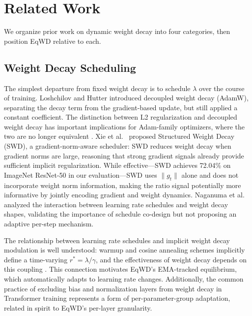 \documentclass{article}
\begin{document}
\section{Related Work}
\label{sec:related}

We organize prior work on dynamic weight decay into four categories,
then position EqWD relative to each.

\subsection{Weight Decay Scheduling}
\label{sec:related_scheduling}

The simplest departure from fixed weight decay is to schedule
$\lambda$ over the course of training. Loshchilov and Hutter
\citep{loshchilov2019adamw} introduced decoupled weight decay (AdamW),
separating the decay term from the gradient-based update, but still
applied a constant coefficient. The distinction between L2
regularization and decoupled weight decay has important implications for
Adam-family optimizers, where the two are no longer equivalent
\citep{loshchilov2019adamw}. Xie et al.~\citep{xie2023swd} proposed
Structured Weight Decay (SWD), a gradient-norm-aware scheduler: SWD
reduces weight decay when gradient norms are large, reasoning that
strong gradient signals already provide sufficient implicit
regularization. While effective---SWD achieves 72.04\% on ImageNet
ResNet-50 in our evaluation---SWD uses $\|g_t\|$ alone and does not
incorporate weight norm information, making the ratio signal potentially
more informative by jointly encoding gradient and weight dynamics.
Naganuma et al.~\citep{naganuma2026} analyzed the interaction between
learning rate schedules and weight decay shapes, validating the
importance of schedule co-design but not proposing an adaptive per-step
mechanism.

The relationship between learning rate schedules and implicit weight
decay modulation is well understood: warmup and cosine annealing schemes
implicitly define a time-varying $r^* = \lambda/\gamma$, and the
effectiveness of weight decay depends on this coupling
\citep{gotmare2018, smith2019superconv}. This connection motivates EqWD's
EMA-tracked equilibrium, which automatically adapts to learning rate
changes. Additionally, the common practice of excluding bias and
normalization layers from weight decay in Transformer training
\citep{devlin2019bert, dosovitskiy2021vit} represents a form of
per-parameter-group adaptation, related in spirit to EqWD's per-layer
granularity.
\end{document}
